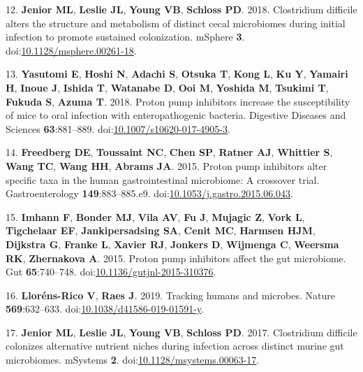 \documentclass[11pt,]{article}
\begin{document}
\hypertarget{ref-Jenior2018}{}
12. \textbf{Jenior ML}, \textbf{Leslie JL}, \textbf{Young VB},
\textbf{Schloss PD}. 2018. Clostridium difficile alters the structure
and metabolism of distinct cecal microbiomes during initial infection to
promote sustained colonization. mSphere \textbf{3}.
doi:\href{https://doi.org/10.1128/msphere.00261-18}{10.1128/msphere.00261-18}.

\hypertarget{ref-Yasutomi2018}{}
13. \textbf{Yasutomi E}, \textbf{Hoshi N}, \textbf{Adachi S},
\textbf{Otsuka T}, \textbf{Kong L}, \textbf{Ku Y}, \textbf{Yamairi H},
\textbf{Inoue J}, \textbf{Ishida T}, \textbf{Watanabe D}, \textbf{Ooi
M}, \textbf{Yoshida M}, \textbf{Tsukimi T}, \textbf{Fukuda S},
\textbf{Azuma T}. 2018. Proton pump inhibitors increase the
susceptibility of mice to oral infection with enteropathogenic bacteria.
Digestive Diseases and Sciences \textbf{63}:881--889.
doi:\href{https://doi.org/10.1007/s10620-017-4905-3}{10.1007/s10620-017-4905-3}.

\hypertarget{ref-Freedberg2015}{}
14. \textbf{Freedberg DE}, \textbf{Toussaint NC}, \textbf{Chen SP},
\textbf{Ratner AJ}, \textbf{Whittier S}, \textbf{Wang TC}, \textbf{Wang
HH}, \textbf{Abrams JA}. 2015. Proton pump inhibitors alter specific
taxa in the human gastrointestinal microbiome: A crossover trial.
Gastroenterology \textbf{149}:883--885.e9.
doi:\href{https://doi.org/10.1053/j.gastro.2015.06.043}{10.1053/j.gastro.2015.06.043}.

\hypertarget{ref-Imhann2015}{}
15. \textbf{Imhann F}, \textbf{Bonder MJ}, \textbf{Vila AV}, \textbf{Fu
J}, \textbf{Mujagic Z}, \textbf{Vork L}, \textbf{Tigchelaar EF},
\textbf{Jankipersadsing SA}, \textbf{Cenit MC}, \textbf{Harmsen HJM},
\textbf{Dijkstra G}, \textbf{Franke L}, \textbf{Xavier RJ},
\textbf{Jonkers D}, \textbf{Wijmenga C}, \textbf{Weersma RK},
\textbf{Zhernakova A}. 2015. Proton pump inhibitors affect the gut
microbiome. Gut \textbf{65}:740--748.
doi:\href{https://doi.org/10.1136/gutjnl-2015-310376}{10.1136/gutjnl-2015-310376}.

\hypertarget{ref-LlornsRico2019}{}
16. \textbf{Lloréns-Rico V}, \textbf{Raes J}. 2019. Tracking humans and
microbes. Nature \textbf{569}:632--633.
doi:\href{https://doi.org/10.1038/d41586-019-01591-y}{10.1038/d41586-019-01591-y}.

\hypertarget{ref-Jenior2017}{}
17. \textbf{Jenior ML}, \textbf{Leslie JL}, \textbf{Young VB},
\textbf{Schloss PD}. 2017. Clostridium difficile colonizes alternative
nutrient niches during infection across distinct murine gut microbiomes.
mSystems \textbf{2}.
doi:\href{https://doi.org/10.1128/msystems.00063-17}{10.1128/msystems.00063-17}.
\end{document}
